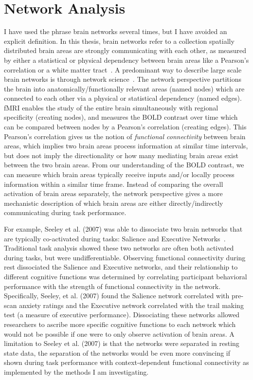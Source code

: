 \documentclass[phd,figures,tables,ackpage,abstractpage,publicabstractpage]{uithesis}
\begin{document}
\section{Network Analysis}

I have used the phrase brain networks several times, but I have avoided an explicit definition.
In this thesis, brain networks refer to a collection spatially distributed brain areas
are strongly communicating with each other, as measured by either a
statistical or physical dependency between
brain areas like a Pearson's correlation or a white matter tract~\cite{Uddin2019}.
A predominant way to describe large scale brain networks is through network science~\cite{Rubinov2010}.
The network perspective partitions the brain into anatomically/functionally relevant areas (named nodes)
which are connected to each other via a physical or statistical dependency (named edges).
fMRI enables the study of the entire brain simultaneously with regional specificity (creating nodes),
and measures the BOLD contrast over time which can be compared between nodes by a Pearson's correlation (creating edges).
This Pearson's correlation gives us the notion of \textit{functional connectivity} between brain areas,
which implies two brain areas process information at similar time intervals, but does not imply
the directionality or how many mediating brain areas exist between the two brain areas.
From our understanding of the BOLD contrast, we can measure which brain areas
typically receive inputs and/or locally process information within a similar time frame.
Instead of comparing the overall activation of brain areas separately, the network perspective
gives a more mechanistic description of which brain areas are either directly/indirectly
communicating during task performance.

For example, Seeley et al. (2007) was able to dissociate two brain networks that are typically
co-activated during tasks: Salience and Executive Networks~\cite{Seeley2007}.
Traditional task analysis showed these two networks are often both activated
during tasks, but were undifferentiable.
Observing functional connectivity during rest dissociated the Salience and Executive networks,
and their relationship to different cognitive functions was determined by correlating
participant behavioral performance with the strength of functional connectivity in the network.
Specifically, Seeley, et al. (2007) found the Salience network correlated with pre-scan anxiety
ratings and the Executive network correlated with the trail making test (a measure of executive
performance).
Dissociating these networks allowed researchers to ascribe more specific cognitive functions
to each network which would not be possible if one were to only observe activation of brain areas.
A limitation to Seeley et al. (2007) is that the networks were separated in resting state data,
the separation of the networks would be even more convincing if shown during task performance
with context-dependent functional connectivity as implemented by the methods I am
investigating.
\end{document}
